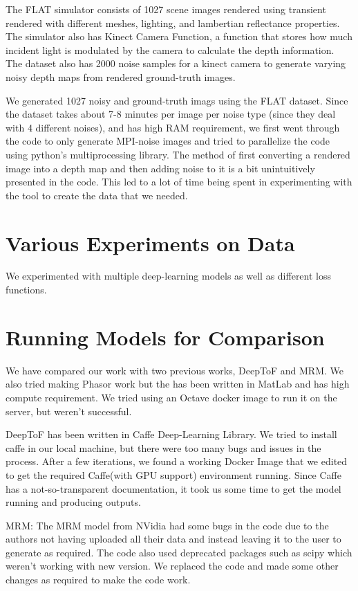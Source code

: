\documentclass[runningheads]{llncs}
\begin{document}
The FLAT simulator consists of 1027 scene images rendered using transient rendered with different meshes, lighting, and lambertian reflectance properties. The simulator also has Kinect Camera Function, a function that stores how much incident light is modulated by the camera to calculate the depth information. The dataset also has 2000 noise samples for a kinect camera to generate varying noisy depth maps from rendered ground-truth images. 

We generated 1027 noisy and ground-truth imags using the FLAT dataset. Since the dataset takes about 7-8 minutes per image per noise type (since they deal with 4 different noises), and has high RAM requirement, we first went through the code to only generate MPI-noise images and tried to parallelize the code using python's multiprocessing library. The method of first converting a rendered image into a depth map and then adding noise to it is a bit unintuitively presented in the code. This led to a lot of time being spent in experimenting with the tool to create the data that we needed.

\section{Various Experiments on Data}

We experimented with multiple deep-learning models as well as different loss functions.  

\section{Running Models for Comparison}

We have compared our work with two previous works, DeepToF and MRM. We also tried making Phasor work but the has been written in MatLab and has high compute requirement. We tried using an Octave docker image to run it on the server, but weren't successful.

DeepToF has been written in Caffe Deep-Learning Library. We tried to install caffe in our local machine, but there were too many bugs and issues in the process. After a few iterations, we found a working Docker Image that we edited to get the required Caffe(with GPU support) environment running. Since Caffe has a not-so-transparent documentation, it took us some time to get the model running and producing outputs.

MRM: The MRM model from NVidia had some bugs in the code due to the authors not having uploaded all their data and instead leaving it to the user to generate as required. The code also used deprecated packages such as scipy which weren't working with new version. We replaced the code and made some other changes as required to make the code work. 
\end{document}
